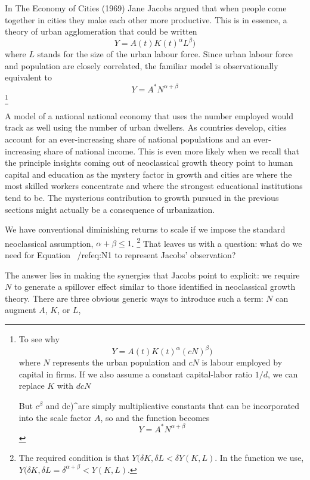 In The Economy of Cities (1969) Jane Jacobs argued that when people come together in cities they make each other more productive. This is in essence, a theory of urban agglomeration that could be written
\begin{equation}\label{eq:LtoN}
Y = A(t) K(t)^\alpha L^\beta) 
\end{equation}
where $L$ stands for the size of the urban labour force. Since urban labour force and population are closely correlated, the familiar model is  observationally equivalent to
\[Y = A^*N^{\alpha+\beta}\]
\footnote{ To see why 
\begin{equation}\label{eq:N1}
Y = A(t) K(t)^\alpha (cN)^\beta) \end{equation}
where $N$ represents the urban population and $cN$ is labour employed by capital in firms. If we also assume a constant capital-labor ratio $1/d$, we can replace $K$ with $dcN$

But $c^\beta$ and dc)^\alpha  are simply  multiplicative constants that can be incorporated into the scale factor $A$, so  and the function becomes 
\[Y = A^*N^{\alpha+\beta}\]}

A model of a national national economy that uses the number employed would track as well using the number of urban dwellers. As countries develop, cities account for an ever-increasing share of  national populations and an ever-increasing share of national income.  This is  even more likely when we recall that the principle insights coming out of neoclassical growth theory point to human capital and education as the mystery factor in growth and cities are where the most skilled workers concentrate and where the strongest educational institutions tend to be. The mysterious contribution to growth pursued in the previous sections might  actually be a consequence of urbanization.

We have conventional diminishing returns to scale  if we impose the standard neoclassical assumption, 
$\alpha +\beta \leq 1 $.
\footnote{The required condition is that 
$Y(\delta K,\delta L< \delta Y(K,L)$. 
In the function we use, 
$Y(\delta K,\delta L= \delta^{\alpha +\beta} <Y(K,L)$.} 
That leaves us with a question: what do we need for Equation ~/ref{eq:N1} to represent Jacobs' observation?  

The answer lies in making the synergies that Jacobs point to explicit: we require $N$ to generate a spillover effect similar to those  identified in neoclassical growth theory. There are three obvious generic ways to introduce such a term: $N$ can augment $A$, $K$, or $L$, 

